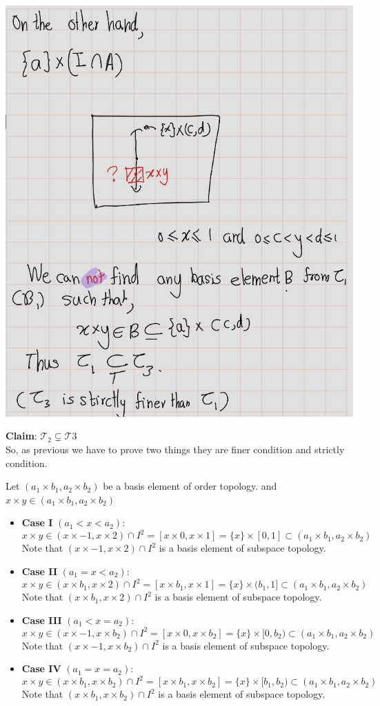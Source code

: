 \documentclass[
]{book}
\theoremstyle{definition}
\theoremstyle{definition}
\theoremstyle{definition}
\theoremstyle{definition}
\theoremstyle{remark}
\begin{document}
\includegraphics{figures/Exercises/Ex 2.16/ex-10-5.png}

\textbf{Claim}: \(\mathcal{T_2}\subsetneq\mathcal{T3}\)\\
So, as previous we have to prove two things they are finer condition and strictly condition.

Let \((a_1\times b_1, a_2 \times b_2)\) be a basis element of order topology. and \(x\times y \in (a_1\times b_1, a_2 \times b_2)\)

\begin{itemize}
\item
  \textbf{Case I} \((a_1<x<a_2)\):
  \[x\times y \in (x\times-1,x\times 2)\cap I^2= [x\times 0,x\times 1]=\{x\}\times [0,1] \subset (a_1\times b_1, a_2 \times b_2)\]
  Note that \((x\times -1,x\times 2)\cap I^2\) is a basis element of subspace topology.
\item
  \textbf{Case II} \((a_1=x<a_2)\):
  \[x\times y \in (x\times b_1,x\times 2)\cap I^2= [x\times b_1,x\times 1]=\{x\}\times (b_1,1] \subset (a_1\times b_1, a_2 \times b_2)\]
  Note that \((x\times b_1,x\times 2)\cap I^2\) is a basis element of subspace topology.
\item
  \textbf{Case III} \((a_1<x=a_2)\):
  \[x\times y \in (x\times -1,x\times b_2)\cap I^2= [x\times 0,x\times b_2]=\{x\}\times [0,b_2) \subset (a_1\times b_1, a_2 \times b_2)\]
  Note that \((x\times -1,x\times b_2)\cap I^2\) is a basis element of subspace topology.
\item
  \textbf{Case IV} \((a_1=x=a_2)\):
  \[x\times y \in (x\times b_1,x\times b_2)\cap I^2= [x\times b_1,x\times b_2]=\{x\}\times [b_1,b_2) \subset (a_1\times b_1, a_2 \times b_2)\]
  Note that \((x\times b_1,x\times b_2)\cap I^2\) is a basis element of subspace topology.
\end{itemize}
\end{document}
